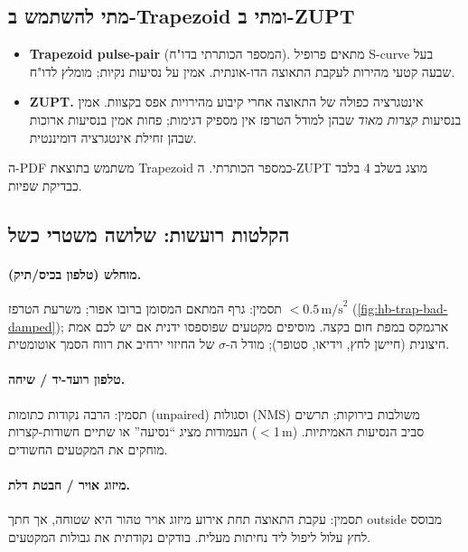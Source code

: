 \documentclass[11pt,a4paper]{article}
\begin{document}
\subsection{מתי להשתמש ב-Trapezoid ומתי ב-ZUPT}

\begin{itemize}
  \item \textbf{\textenglish{Trapezoid pulse-pair}} (המספר הכותרתי
    בדו"ח). מתאים פרופיל \textenglish{S-curve} בעל שבעה קטעי
    מהירות לעקבת התאוצה הדו-אונתית. אמין על נסיעות נקיות; מומלץ
    לדו"ח.
  \item \textbf{\textenglish{ZUPT}.} אינטגרציה כפולה של התאוצה
    אחרי קיבוע מהירויות אפס בקצוות. אמין בנסיעות \emph{קצרות
    מאוד} שבהן למודל הטרפז אין מספיק דגימות; פחות אמין בנסיעות
    ארוכות שבהן זחילת אינטגרציה דומיננטית.
\end{itemize}

ה-\textenglish{PDF} משתמש בתוצאת \textenglish{Trapezoid} כמספר
הכותרתי. ה-\textenglish{ZUPT} מוצג בשלב 4 בלבד כבדיקת שפיות.

\subsection{הקלטות רועשות: שלושה משטרי כשל}

\paragraph{מוחלש (טלפון בכיס/תיק).}
תסמין: גרף המתאם המסומן ברובו אפור; משרעת הטרפז
$<0.5\,\mathrm{m/s}^2$ (\autoref{fig:hb-trap-bad-damped});
ארגמקס במפת חום בקצה. מוסיפים מקטעים שפוספסו ידנית אם יש לכם
אמת חיצונית (חיישן לחץ, וידיאו, סטופר); מודל ה-$\sigma$ של
החיזוי ירחיב את רווח הסמך אוטומטית.

\paragraph{טלפון רועד-יד / שיחה.}
תסמין: הרבה נקודות כתומות (\textenglish{unpaired}) וסגולות
(\textenglish{NMS}) משולבות בירוקות; תרשים העמודות מציג
``נסיעה'' או שתיים חשודות-קצרות ($<$1\,\textenglish{m}) סביב
הנסיעות האמיתיות. מוחקים את המקטעים החשודים.

\paragraph{מיזוג אויר / חבטת דלת.}
תסמין: עקבת התאוצה תחת אירוע מיזוג אויר טהור היא שטוחה, אך
חתך \textenglish{outside} מבוסס לחץ עלול ליפול ליד נחיתות
מעלית. בודקים נקודתית את גבולות המקטעים.
\end{document}
